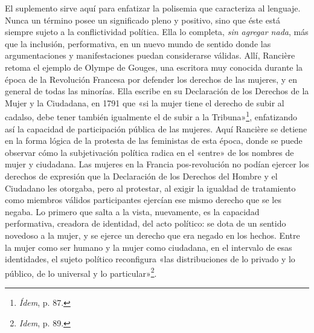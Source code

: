 El suplemento sirve aquí para enfatizar la polisemia que caracteriza al lenguaje. Nunca un término posee un significado pleno y positivo, sino que éste está siempre sujeto a la conflictividad política. Ella lo completa, \emph{sin agregar nada}, más que la inclusión, performativa, en un nuevo mundo de sentido donde las argumentaciones y manifestaciones puedan considerarse válidas. Allí, Rancière retoma el ejemplo de Olympe de Gouges, una escritora muy conocida durante la época de la Revolución Francesa por defender los derechos de las mujeres, y en general de todas las minorías. Ella escribe en su Declaración de los Derechos de la Mujer y la Ciudadana, en 1791 que «si la mujer tiene el derecho de subir al cadalso, debe tener también igualmente el de subir a la Tribuna»\footnote{\emph{Ídem}, p. 87.}, enfatizando así la capacidad de participación pública de las mujeres. Aquí Rancière se detiene en la forma lógica de la protesta de las feministas de esta época, donde se puede observar cómo la subjetivación política radica en el «entre» de los nombres de mujer y ciudadana. Las mujeres en la Francia pos-revolución no podían ejercer los derechos de expresión que la Declaración de los Derechos del Hombre y el Ciudadano les otorgaba, pero al protestar, al exigir la igualdad de tratamiento como miembros válidos participantes ejercían ese mismo derecho que se les negaba. Lo primero que salta a la vista, nuevamente, es la capacidad performativa, creadora de identidad, del acto político: se dota de un sentido novedoso a la mujer, y se ejerce un derecho que era negado en los hechos. Entre la mujer como ser humano y la mujer como ciudadana, en el intervalo de esas identidades, el sujeto político reconfigura «las distribuciones de lo privado y lo público, de lo universal y lo particular»\footnote{\emph{Idem}, p. 89.}.

